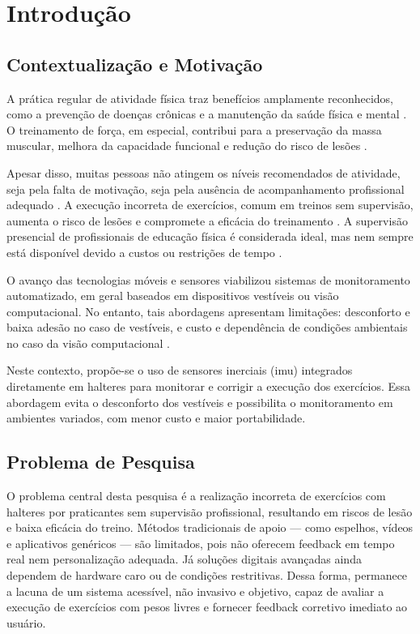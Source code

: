 \chapter{Introdução}

\section{Contextualização e Motivação}

A prática regular de atividade física traz benefícios amplamente reconhecidos, como a prevenção de doenças crônicas e a manutenção da saúde física e mental \cite{dzaja-quantitative-nodate,gupta-yogahelp-2021,hwang-estimation-2023}. O treinamento de força, em especial, contribui para a preservação da massa muscular, melhora da capacidade funcional e redução do risco de lesões \cite{da2025atividade, hwang-estimation-2023}.  

Apesar disso, muitas pessoas não atingem os níveis recomendados de atividade, seja pela falta de motivação, seja pela ausência de acompanhamento profissional adequado \cite{balkhi-multipurpose-nodate}. A execução incorreta de exercícios, comum em treinos sem supervisão, aumenta o risco de lesões e compromete a eficácia do treinamento \cite{UnifisioHomeCare2025}. A supervisão presencial de profissionais de educação física é considerada ideal, mas nem sempre está disponível devido a custos ou restrições de tempo \cite{dzaja-quantitative-nodate}.

O avanço das tecnologias móveis e sensores viabilizou sistemas de monitoramento automatizado, em geral baseados em dispositivos vestíveis ou visão computacional. No entanto, tais abordagens apresentam limitações: desconforto e baixa adesão no caso de vestíveis, e custo e dependência de condições ambientais no caso da visão computacional \cite{dzaja-quantitative-nodate,gupta-yogahelp-2021}.  

Neste contexto, propõe-se o uso de sensores inerciais (\gls{imu}) integrados diretamente em halteres para monitorar e corrigir a execução dos exercícios. Essa abordagem evita o desconforto dos vestíveis e possibilita o monitoramento em ambientes variados, com menor custo e maior portabilidade.

\section{Problema de Pesquisa}

O problema central desta pesquisa é a realização incorreta de exercícios com halteres por praticantes sem supervisão profissional, resultando em riscos de lesão e baixa eficácia do treino. Métodos tradicionais de apoio — como espelhos, vídeos e aplicativos genéricos — são limitados, pois não oferecem feedback em tempo real nem personalização adequada. Já soluções digitais avançadas ainda dependem de hardware caro ou de condições restritivas. Dessa forma, permanece a lacuna de um sistema acessível, não invasivo e objetivo, capaz de avaliar a execução de exercícios com pesos livres e fornecer feedback corretivo imediato ao usuário.

